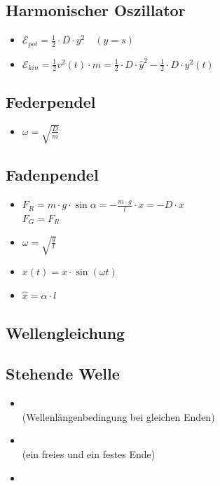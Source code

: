 \documentclass[paper = a4, twocolumn]{scrartcl}
\DeclareRobustCommand{\E}{\mathcal{E}}
\begin{document}
\subsection{Harmonischer Oszillator}
\begin{itemize}
\item{
	\( \E_{pot} = \frac{1}{2} \cdot D \cdot y^2 \quad (y = s) \)
}
\item
	\( \E_{kin} = \frac{1}{2} v^2(t) \cdot m = \frac{1}{2} \cdot D \cdot
	\hat{y}^2 - \frac{1}{2} \cdot D \cdot y^2(t) \)
\itemb{
	\( \E_{ges} = \frac{1}{2} \cdot D \cdot \hat{y}^2 \)
}
\end{itemize}

\subsection{Federpendel}
\begin{itemize}
\item
	\( \omega = \sqrt{\frac{D}{m}} \)
\end{itemize}

\subsection{Fadenpendel}
\begin{itemize}
\item
	\( F_R = m \cdot g \cdot \sin \alpha = - \frac{m \cdot g}{l} \cdot x = -D
	\cdot x \)\\
	\( F_G = F_R \)
\item
	\( \omega = \sqrt{\frac{g}{l}} \)
\item
	\( x(t) = \hat{x} \cdot \sin(\omega t) \)
\item
	\( \hat{x} = \alpha \cdot l \)
\end{itemize}

\subsection{Wellengleichung}
\begin{itemize}
\end{itemize}

\subsection{Stehende Welle}
\begin{itemize}
\item
	\\
	(Wellenlängenbedingung bei gleichen Enden)
\item
	\\
	(ein freies und ein festes Ende)
\item
\end{itemize}
\end{document}
